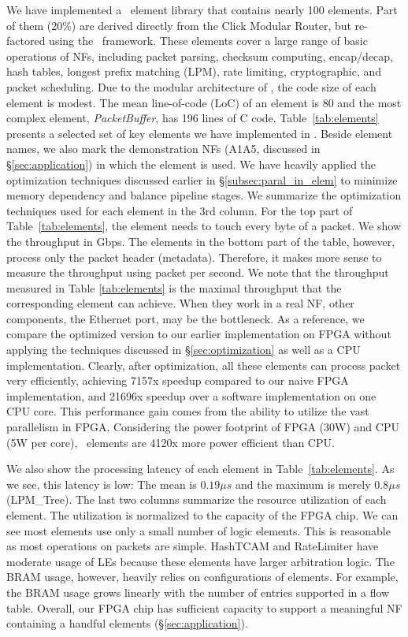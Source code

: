 We have implemented a \name\ element library that contains nearly 100 elements. 
Part of them (20\%) are derived directly from the Click Modular Router, 
but re-factored using the \name\ framework. 
These elements cover a large range of basic operations of NFs, 
including packet parsing, checksum computing,
encap/decap, hash tables, longest prefix matching (LPM), 
rate limiting, cryptographic, and packet scheduling. 
%
Due to the modular architecture of \name, the code size of each element is modest. 
The mean line-of-code (LoC) of an element is 80 and 
the most complex element, \textit{PacketBuffer}, has 196 lines of C code. 
% 
Table~\ref{tab:elements} presents a selected set of key elements we have implemented in \name. 
Beside element names, we also mark the demonstration NFs (A1\approx A5, discussed in \S\ref{sec:application}) in 
which the element is used.
%
We have heavily applied the optimization techniques discussed earlier in \S\ref{subsec:paral_in_elem} to 
minimize memory dependency and balance pipeline stages.
We summarize the optimization techniques used for each element in the 3rd column.
For the top part of Table~\ref{tab:elements}, the element needs to touch every byte of a packet. We show the throughput in Gbps.
The elements in the bottom part of the table, however, process only the packet header (metadata). Therefore, it makes more
sense to measure the throughput using packet per second.
%
We note that the throughput measured in Table \ref{tab:elements} is the maximal throughput that the corresponding element can achieve.
When they work in a real NF, other components, \eg the Ethernet port, may be the bottleneck.
%
As a reference, we compare the optimized version to our earlier  
implementation on FPGA without applying the techniques discussed in \S\ref{sec:optimization} as well as a CPU implementation.
Clearly, after optimization, all these elements can process packet very efficiently, achieving 7\approx 157x speedup compared to our naive FPGA implementation, and 21\approx 696x speedup over a software implementation on one CPU core.
This performance gain comes from the ability to utilize the vast parallelism in FPGA.
%
Considering the power footprint of FPGA (\approx 30W) and CPU (\approx 5W per core), 
\name\ elements are 4\approx 120x more power efficient than CPU. 

We also show the processing latency of each element in Table~\ref{tab:elements}. 
As we see, this latency is low: The mean is $0.19 \mu s$ and the maximum is merely $0.8 \mu s$ (LPM\_Tree).
The last two columns summarize the resource utilization of each element. The utilization is normalized to
the capacity of the FPGA chip. 
We can see most elements use only a small number of logic elements.
This is reasonable as most operations on packets are simple. 
HashTCAM and RateLimiter have moderate usage of LEs because these elements have larger arbitration logic. 
%
The BRAM usage, however, heavily relies on configurations of elements. For example, the BRAM usage grows linearly 
with the number of entries supported in a flow table. 
Overall, our FPGA chip has sufficient capacity to support a meaningful 
NF containing a handful elements (\S\ref{sec:application}).



